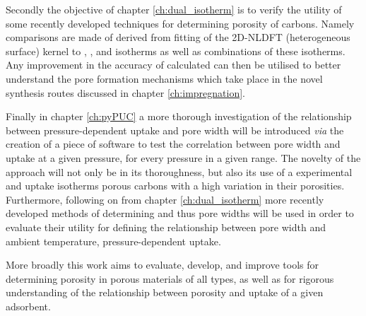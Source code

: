 Secondly the objective of chapter \ref{ch:dual_isotherm} is to verify the utility of some recently developed techniques for determining porosity of carbons. Namely comparisons are made of  derived from fitting of the 2D-NLDFT (heterogeneous surface) kernel to , , and  isotherms as well as combinations of these isotherms. Any improvement in the accuracy of calculated  can then be utilised to better understand the pore formation mechanisms which take place in the novel synthesis routes discussed in chapter \ref{ch:impregnation}. 

Finally in chapter \ref{ch:pyPUC} a more thorough investigation of the relationship between pressure-dependent  uptake and pore width will be introduced \textit{via} the creation of a piece of software to test the correlation between pore width and  uptake at a given pressure, for every pressure in a given range. The novelty of the approach will not only be in its thoroughness, but also its use of a experimental  and  uptake isotherms porous carbons with a high variation in their porosities. Furthermore, following on from chapter \ref{ch:dual_isotherm} more recently developed methods of determining  and thus pore widths will be used in order to evaluate their utility for defining the relationship between pore width and ambient temperature, pressure-dependent  uptake.

More broadly this work aims to evaluate, develop, and improve tools for determining porosity in porous materials of all types, as well as for rigorous understanding of the relationship between porosity and uptake of a given \gls{adsorbent}.  